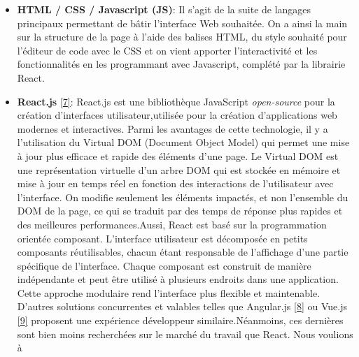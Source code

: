 \documentclass[12pt]{article}
\begin{document}
      \begin{itemize}
            \item
                  \textbf{HTML / CSS / Javascript (JS)}: Il s'agit de la suite de
                  langages principaux permettant de bâtir l'interface Web souhaitée. On
                  a ainsi la main sur la structure de la page à l'aide des balises HTML,
                  du style souhaité pour l'éditeur de code avec le CSS et on vient
                  apporter l'interactivité et les fonctionnalités en les programmant
                  avec Javascript, complété par la librairie React.
            \item
                  \textbf{React.js} \protect\hyperlink{ref-react}{{[}7{]}}: React.js est
                  une bibliothèque JavaScript \emph{open-source} pour la création
                  d'interfaces utilisateur,utilisée pour la création d'applications web
                  modernes et interactives. Parmi les avantages de cette technologie, il
                  y a l'utilisation du Virtual DOM (Document Object Model) qui permet
                  une mise à jour plus efficace et rapide des éléments d'une page. Le
                  Virtual DOM est une représentation virtuelle d'un arbre DOM qui est
                  stockée en mémoire et mise à jour en temps réel en fonction des
                  interactions de l'utilisateur avec l'interface. On modifie seulement
                  les éléments impactés, et non l'ensemble du DOM de la page, ce qui se
                  traduit par des temps de réponse plus rapides et des meilleures
                  performances.\newline  Aussi, React est basé sur la programmation
                  orientée composant. L'interface utilisateur est décomposée en petits
                  composants réutilisables, chacun étant responsable de l'affichage
                  d'une partie spécifique de l'interface. Chaque composant est construit
                  de manière indépendante et peut être utilisé à plusieurs endroits dans
                  une application. Cette approche modulaire rend l'interface plus
                  flexible et maintenable. D'autres solutions concurrentes et valables
                  telles que Angular.js \protect\hyperlink{ref-angularjs}{{[}8{]}} ou
                  Vue.js \protect\hyperlink{ref-vuejs}{{[}9{]}} proposent une expérience
                  développeur similaire.\newline  Néanmoins, ces dernières sont bien
                  moins recherchées sur le marché du travail que React. Nous voulions à

\end{itemize}
\end{document}
